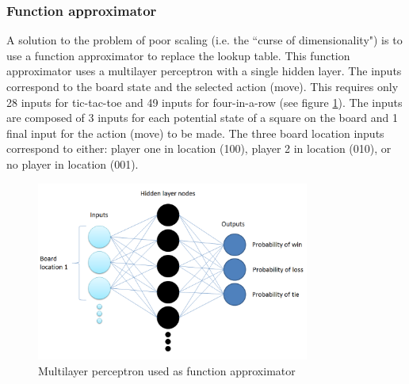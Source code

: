 \documentclass[12pt,a4paper]{article}
\begin{document}
\subsubsection*{Function approximator}
A solution to the problem of poor scaling (i.e. the ``curse of dimensionality") is to use a function approximator to replace the lookup table. This function approximator uses a multilayer perceptron with a single hidden layer. The inputs correspond to the board state and the selected action (move). This requires only 28 inputs for tic-tac-toe and 49 inputs for four-in-a-row (see figure \ref{fig:funcApproxFigure}). The inputs are composed of 3 inputs for each potential state of a square on the board and 1 final input for the action (move) to be made. The three board location inputs correspond to either: player one in location (100), player 2 in location (010), or no player in location (001).
\begin{figure}[h]
\centering
\includegraphics[width=0.8\textwidth]{Figures/functionApproxFigure.png}
\caption{Multilayer perceptron used as function approximator}
\label{fig:funcApproxFigure}
\end{figure}
\end{document}
